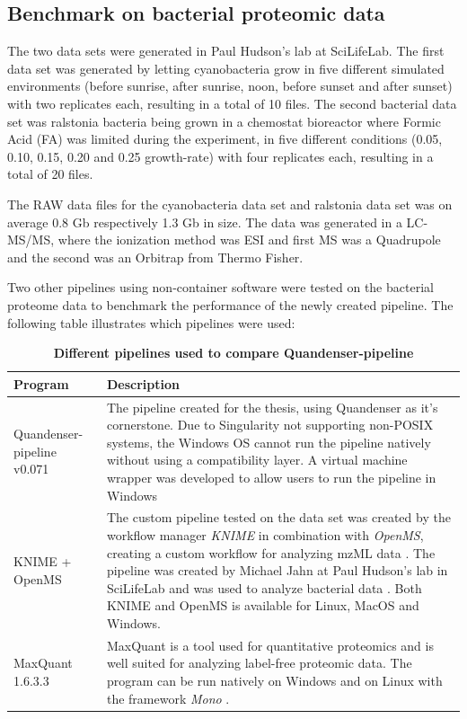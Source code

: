 \subsection{Benchmark on bacterial proteomic data}
The two data sets were generated in Paul Hudson's lab at SciLifeLab. The first data set was generated by letting cyanobacteria grow in five different simulated environments (before sunrise, after sunrise, noon, before sunset and after sunset) with two replicates each, resulting in a total of 10 files. The second bacterial data set was ralstonia bacteria being grown in a chemostat bioreactor where Formic Acid (FA) was limited during the experiment, in five different conditions (0.05, 0.10, 0.15, 0.20 and 0.25 growth-rate) with four replicates each, resulting in a total of 20 files.

The RAW data files for the cyanobacteria data set and ralstonia data set was on average 0.8 Gb respectively 1.3 Gb in size. The data was generated in a LC-MS/MS, where the ionization method was ESI and first MS was a Quadrupole and the second was an Orbitrap from Thermo Fisher.

Two other pipelines using non-container software were tested on the bacterial proteome data to benchmark the performance of the newly created pipeline. The following table illustrates which pipelines were used:

\newcommand{\textone}{\small The pipeline created for the thesis, using Quandenser as it's cornerstone. Due to Singularity not supporting non-POSIX systems, the Windows OS cannot run the pipeline natively without using a compatibility layer. A virtual machine wrapper was developed to allow users to run the pipeline in Windows}
\newcommand{\texttwo}{\small The custom pipeline tested on the data set was created by the workflow manager \textit{KNIME} in combination with \textit{OpenMS}, creating a custom workflow for analyzing mzML data \cite{knime} \cite{openms}. The pipeline was created by Michael Jahn at Paul Hudson's lab in SciLifeLab and was used to analyze bacterial data \cite{m-jahn-pipeline}. Both KNIME and OpenMS is available for Linux, MacOS and Windows.}
\newcommand{\textthree}{\small MaxQuant is a tool used for quantitative proteomics and is well suited for analyzing label-free proteomic data. The program can be run natively on Windows and on Linux with the framework \textit{Mono} \cite{maxquant} \cite{maxquant-installation}.}

\begin{table}[H]
\caption{\textbf{Different pipelines used to compare Quandenser-pipeline}}
\begin{center}
\begin{tabular}{|p{4cm}|p{9cm}|}
\hline
Program & Description \\ \hline \hline
Quandenser-pipeline v0.071 & \textone \\ \hline
KNIME + OpenMS & \texttwo \\ \hline
MaxQuant 1.6.3.3 & \textthree \\ \hline
\end{tabular}
\end{center}
\end{table}

